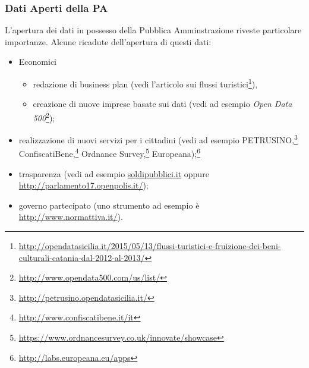 \documentclass[8pt]{beamer}
\begin{document}
\begin{frame}
\frametitle{Dati Aperti della PA}
L'apertura dei dati in possesso della Pubblica Amminstrazione riveste
particolare importanze. Alcune ricadute dell'apertura di questi dati:
\vspace{\baselineskip}

\begin{itemize} [<+->]
 \item Economici
 \begin{itemize}
  \item redazione di business plan (vedi l'articolo sui flussi turistici\footnote{\url{http://opendatasicilia.it/2015/05/13/flussi-turistici-e-fruizione-dei-beni-culturali-catania-dal-2012-al-2013/}}),
  \item creazione di nuove imprese basate sui dati (vedi ad esempio \emph{Open Data 500}\footnote{\url{http://www.opendata500.com/us/list/}});
 \end{itemize}
 \item realizzazione di nuovi servizi per i cittadini (vedi ad esempio PETRUSINO,\footnote{\url{http://petrusino.opendatasicilia.it/}}
 ConfiscatiBene,\footnote{\url{http://www.confiscatibene.it/it}} Ordnance Survey,\footnote{\url{https://www.ordnancesurvey.co.uk/innovate/showcase}} Europeana);\footnote{\url{http://labs.europeana.eu/apps}}
 \item trasparenza (vedi ad esempio \url{soldipubblici.it} oppure \url{http://parlamento17.openpolis.it/});
 \item governo partecipato (uno strumento ad esempio è \url{http://www.normattiva.it/}).
\end{itemize}
\end{frame}
\end{document}
